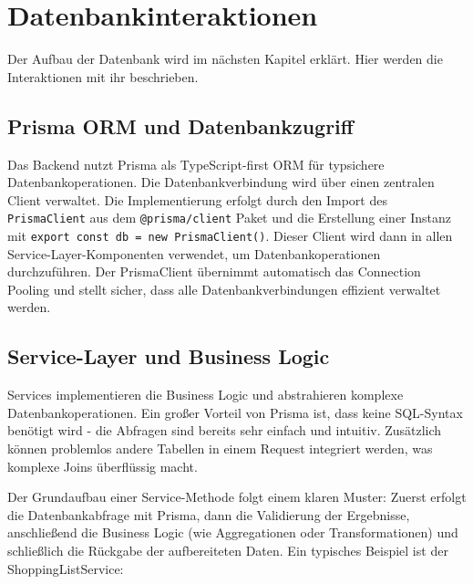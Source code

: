 \section{Datenbankinteraktionen}

Der Aufbau der Datenbank wird im nächsten Kapitel erklärt. Hier werden die Interaktionen mit ihr beschrieben.

\subsection{Prisma ORM und Datenbankzugriff}

Das Backend nutzt Prisma als TypeScript-first ORM für typsichere Datenbankoperationen. Die Datenbankverbindung wird über einen zentralen Client verwaltet. Die Implementierung erfolgt durch den Import des \texttt{PrismaClient} aus dem \texttt{@prisma/client} Paket und die Erstellung einer Instanz mit \texttt{export const db = new PrismaClient()}. Dieser Client wird dann in allen Service-Layer-Komponenten verwendet, um Datenbankoperationen durchzuführen. Der PrismaClient übernimmt automatisch das Connection Pooling und stellt sicher, dass alle Datenbankverbindungen effizient verwaltet werden.

\subsection{Service-Layer und Business Logic}

Services implementieren die Business Logic und abstrahieren komplexe Datenbankoperationen. Ein großer Vorteil von Prisma ist, dass keine SQL-Syntax benötigt wird - die Abfragen sind bereits sehr einfach und intuitiv. Zusätzlich können problemlos andere Tabellen in einem Request integriert werden, was komplexe Joins überflüssig macht.

Der Grundaufbau einer Service-Methode folgt einem klaren Muster: Zuerst erfolgt die Datenbankabfrage mit Prisma, dann die Validierung der Ergebnisse, anschließend die Business Logic (wie Aggregationen oder Transformationen) und schließlich die Rückgabe der aufbereiteten Daten. Ein typisches Beispiel ist der ShoppingListService:

